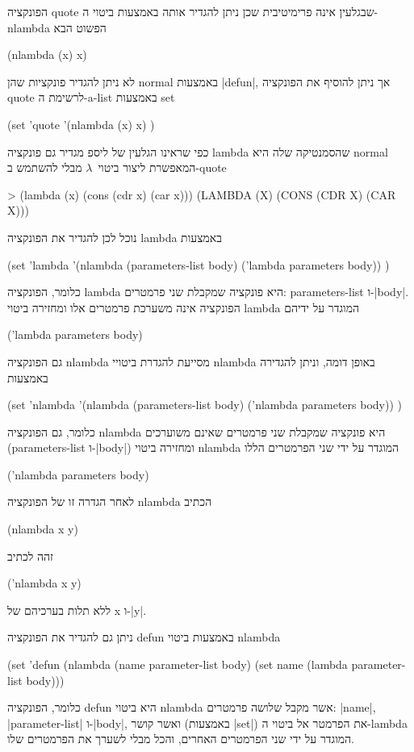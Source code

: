 \documentclass[a4paper,12pt,reqno]{article}
\begin{document}
הפונקציה quote שבגלעין אינה פרימיטיבית שכן ניתן להגדיר אותה באמצעות ביטוי
ה-nlambda הפשוט הבא
\begin{LISP}
(nlambda (x) x)
\end{LISP}
לא ניתן להגדיר פונקציות שהן normal באמצעות \E|defun|, אך ניתן להוסיף את הפונקציה
quote לרשימת ה-a-list באמצעות set
\begin{LISP}
(set 'quote
    '(nlambda (x) x)
)
\end{LISP}
כפי שראינו הגלעין של ליספ מגדיר גם פונקציה lambda שהסמנטיקה שלה היא normal
המאפשרת ליצור ביטוי~$λ$ מבלי להשתמש ב-quote
\begin{LISP}
> (lambda (x) (cons (cdr x) (car x)))
(LAMBDA (X) (CONS (CDR X) (CAR X)))
\end{LISP}
נוכל לכן להגדיר את הפונקציה lambda באמצעות
\begin{LISP}
(set 'lambda
  '(nlambda (parameters-list body) ('lambda parameters body))
)
\end{LISP}
כלומר, הפונקציה lambda היא פונקציה שמקבלת שני פרמטרים: parameters-list
ו-\E|body|. הפונקציה אינה משערכת פרמטרים אלו ומחזירה ביטוי lambda המוגדר על ידיהם
\begin{LISP}
  ('lambda parameters body)
\end{LISP}
גם הפונקציה nlambda מסייעת להגדרת ביטויי nlambda באופן דומה, וניתן להגדירה
באמצעות
\begin{LISP}
(set 'nlambda
  '(nlambda (parameters-list body) ('nlambda parameters body))
)
\end{LISP}
כלומר, גם הפונקציה nlambda היא פונקציה שמקבלת שני פרמטרים שאינם משוערכים
(parameters-list ו-\E|body|) ומחזירה ביטוי nlambda המוגדר על ידי
שני הפרמטרים הללו
\begin{LISP}
  ('nlambda parameters body)
\end{LISP}
לאחר הגדרה זו של הפונקציה nlambda הכתיב
\begin{LISP}
  (nlambda x y)
\end{LISP}
זהה לכתיב
\begin{LISP}
  ('nlambda x y)
\end{LISP}
ללא תלות בערכיהם של x ו-\E|y|.

ניתן גם להגדיר את הפונקציה defun באמצעות ביטוי nlambda
\begin{LISP}
(set 'defun
  (nlambda (name parameter-list body)
      (set name (lambda parameter-list body)))
\end{LISP}
כלומר, הפונקציה defun היא ביטוי nlambda אשר מקבל שלושה פרמטרים: \E|name|,
\E|parameter-list| ו-\E|body|, ואשר קושר (באמצעות \E|set|) את הפרמטר אל ביטוי
ה-lambda המוגדר על ידי שני הפרמטרים האחרים, והכל מבלי לשערך את הפרמטרים שלו.
\end{document}
